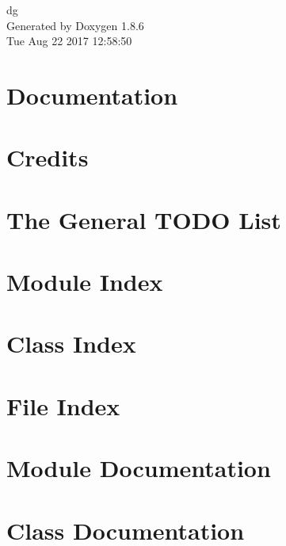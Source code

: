 \documentclass[twoside]{book}
\newcommand{\clearemptydoublepage}{%
  \newpage{\pagestyle{empty}\cleardoublepage}%
}
\begin{document}
\begin{titlepage}
\vspace*{7cm}
\begin{center}%
{\Large dg }\\
\vspace*{1cm}
{\large Generated by Doxygen 1.8.6}\\
\vspace*{0.5cm}
{\small Tue Aug 22 2017 12:58:50}\\
\end{center}
\end{titlepage}
\clearemptydoublepage
\tableofcontents
\clearemptydoublepage
{}

\chapter{Documentation}
\label{index}
\chapter{Credits}
\label{credits}

\chapter{The General T\-O\-D\-O List}
\label{mytodo}

\chapter{Module Index}

\chapter{Class Index}

\chapter{File Index}

\chapter{Module Documentation}











\chapter{Class Documentation}




















\end{document}
